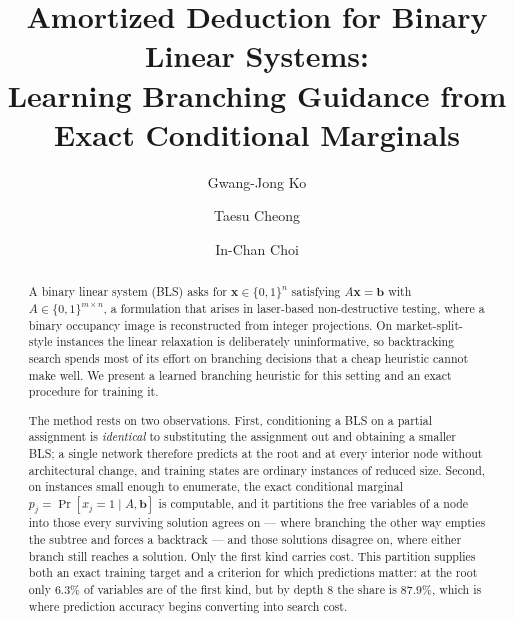 \documentclass[final,5p,times,twocolumn]{elsarticle}
\begin{document}
\begin{frontmatter}

\title{Amortized Deduction for Binary Linear Systems:\\
Learning Branching Guidance from Exact Conditional Marginals}

\author[ku]{Gwang-Jong Ko}
\author[ku]{Taesu Cheong}
\author[ku]{In-Chan Choi}

\begin{abstract}
A binary linear system (BLS) asks for $\mathbf{x}\in\{0,1\}^n$ satisfying $A\mathbf{x}=\mathbf{b}$ with $A\in\{0,1\}^{m\times n}$, a formulation that arises in laser-based non-destructive testing, where a binary occupancy image is reconstructed from integer projections. On market-split-style instances the linear relaxation is deliberately uninformative, so backtracking search spends most of its effort on branching decisions that a cheap heuristic cannot make well. We present a learned branching heuristic for this setting and an exact procedure for training it.

The method rests on two observations. First, conditioning a BLS on a partial assignment is \emph{identical} to substituting the assignment out and obtaining a smaller BLS; a single network therefore predicts at the root and at every interior node without architectural change, and training states are ordinary instances of reduced size. Second, on instances small enough to enumerate, the exact conditional marginal $p_j=\Pr[x_j=1\mid A,\mathbf{b}]$ is computable, and it partitions the free variables of a node into those every surviving solution agrees on --- where branching the other way empties the subtree and forces a backtrack --- and those solutions disagree on, where either branch still reaches a solution. Only the first kind carries cost. This partition supplies both an exact training target and a criterion for which predictions matter: at the root only $6.3\%$ of variables are of the first kind, but by depth $8$ the share is $87.9\%$, which is where prediction accuracy begins converting into search cost.


\end{abstract}
\end{frontmatter}
\end{document}
